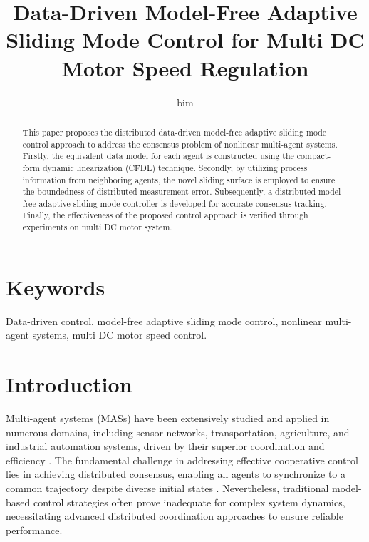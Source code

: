 \documentclass[journal,onecolumn]{IEEEtran}
\title{\LARGE Data-Driven Model-Free Adaptive Sliding Mode Control for Multi DC Motor Speed Regulation}
\author{bim}
\begin{document}
\maketitle

\begin{abstract}
    This paper proposes the distributed data-driven model-free adaptive sliding mode control approach to address the consensus problem of nonlinear multi-agent systems. Firstly, the equivalent data model for each agent is constructed using the compact-form dynamic linearization (CFDL) technique. Secondly, by utilizing process information from neighboring agents, the novel sliding surface is employed to ensure the boundedness of distributed measurement error. Subsequently, a distributed model-free adaptive sliding mode controller is developed for accurate consensus tracking. Finally, the effectiveness of the proposed control approach is verified through experiments on multi DC motor system.
\end{abstract}


\section*{Keywords}
Data-driven control, model-free adaptive sliding mode control, nonlinear multi-agent systems, multi DC motor speed control.

\section{Introduction}\label{section:1}


Multi-agent systems (MASs) have been extensively studied and applied in numerous domains, including sensor networks, transportation, agriculture, and industrial automation systems, driven by their superior coordination and efficiency \cite{1,2,3}. The fundamental challenge in addressing effective cooperative control lies in achieving distributed consensus, enabling all agents to synchronize to a common trajectory despite diverse initial states \cite{4,5,6}. Nevertheless, traditional model-based control strategies often prove inadequate for complex system dynamics, necessitating advanced distributed coordination approaches to ensure reliable performance. 
\end{document}
